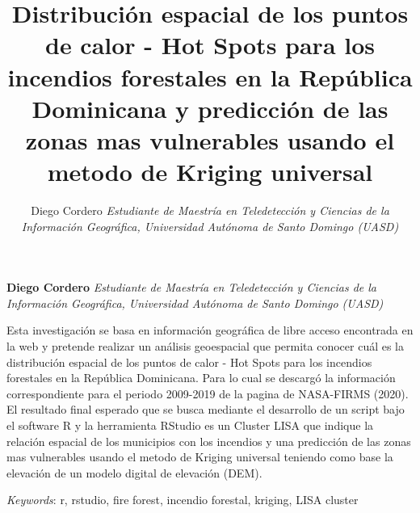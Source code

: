 \documentclass[11pt,]{article}
\title{Distribución espacial de los puntos de calor - Hot Spots para los
incendios forestales en la República Dominicana y predicción de las
zonas mas vulnerables usando el metodo de Kriging universal  }
\author{\Large Diego Cordero\vspace{0.05in} \newline\normalsize\emph{Estudiante de Maestría en Teledetección y Ciencias de la Información
Geográfica, Universidad Autónoma de Santo Domingo (UASD)}  }
\date{}
\newcommand*{\authorfont}{\fontfamily{phv}\selectfont}
\renewenvironment{abstract}
 {{%
    \setlength{\leftmargin}{0mm}
    \setlength{\rightmargin}{\leftmargin}%
  }%
  \relax}
 {\endlist}
\begin{document}
	
%

{%
\setlength{\parindent}{0pt}
\thispagestyle{plain}
{\fontsize{18}{20}\selectfont\raggedright 
\maketitle  %

}

{
   \vskip 13.5pt\relax \normalsize\fontsize{11}{12} 
\textbf{\authorfont Diego Cordero} \hskip 15pt \emph{\small Estudiante de Maestría en Teledetección y Ciencias de la Información
Geográfica, Universidad Autónoma de Santo Domingo (UASD)}   

}

}








\begin{abstract}

    \hbox{\vrule height .2pt width 39.14pc}

    \vskip 8.5pt %

\noindent Esta investigación se basa en información geográfica de libre acceso
encontrada en la web y pretende realizar un análisis geoespacial que
permita conocer cuál es la distribución espacial de los puntos de calor
- Hot Spots para los incendios forestales en la República Dominicana.
Para lo cual se descargó la información correspondiente para el periodo
2009-2019 de la pagina de NASA-FIRMS (2020). El resultado final esperado
que se busca mediante el desarrollo de un script bajo el software R y la
herramienta RStudio es un Cluster LISA que indique la relación espacial
de los municipios con los incendios y una predicción de las zonas mas
vulnerables usando el metodo de Kriging universal teniendo como base la
elevación de un modelo digital de elevación (DEM).


\vskip 8.5pt \noindent \emph{Keywords}: r, rstudio, fire forest, incendio forestal, kriging, LISA cluster \par

    \hbox{\vrule height .2pt width 39.14pc}



\end{abstract}
\end{document}
